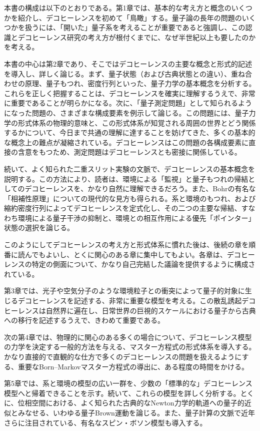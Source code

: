 本書の構成は以下のとおりである。第1章では、基本的な考え方と概念のいくつかを紹介し、デコヒーレンスを初めて「鳥瞰」する。量子論の長年の問題のいくつかを扱うには、「開いた」量子系を考えることが重要であると強調し、この認識とデコヒーレンス研究の考え方が根付くまでに、なぜ半世紀以上も要したのかを考える。

本書の中心は第2章であり、そこではデコヒーレンスの主要な概念と形式的記述を導入し、詳しく論じる。まず、量子状態（および古典状態との違い）、重ね合わせの原理、量子もつれ、密度行列といった、量子力学の基本概念を分析する。これらを正しく把握することは、デコヒーレンスを確実に理解するうえで、非常に重要であることが明らかになる。次に、「量子測定問題」として知られるようになった問題の、さまざまな構成要素を例示して論じる。この問題には、量子力学の形式体系の物理的意味と、この形式体系が知覚される周囲の世界とどう関係するかについて、今日まで共通の理解に達することを妨げてきた、多くの基本的な概念上の難点が凝縮されている。デコヒーレンスはこの問題の各構成要素に直接の含意をもつため、測定問題はデコヒーレンスとも密接に関係している。

続いて、よく知られた二重スリット実験の文脈で、デコヒーレンスの基本概念を説明する。この方法により、読者は、環境による「監視」と量子もつれの帰結としてのデコヒーレンスを、かなり自然に理解できるだろう。また、Bohrの有名な「相補性原理」についての現代的な見方も得られる。系と環境のもつれ、および縮約密度行列によってデコヒーレンスを定式化し、その二つの主要な帰結、すなわち環境による量子干渉の抑制と、環境との相互作用による優先「ポインター」状態の選択を論じる。

このようにしてデコヒーレンスの考え方と形式体系に慣れた後は、後続の章を順番に読んでもよいし、とくに関心のある章に集中してもよい。各章は、デコヒーレンスの特定の側面について、かなり自己完結した議論を提供するように構成されている。

第3章では、光子や空気分子のような環境粒子との衝突によって量子的対象に生じるデコヒーレンスを記述する、非常に重要な模型を考える。この散乱誘起デコヒーレンスは自然界に遍在し、日常世界の巨視的スケールにおける量子から古典への移行を記述するうえで、きわめて重要である。

次の第4章では、物理的に関心のある多くの場合について、デコヒーレンス模型の力学を決定する一般的方法を与える、マスター方程式の形式体系を導入する。かなり直接的で直観的な仕方で多くのデコヒーレンスの問題を扱えるようにする、重要なBorn--Markovマスター方程式の導出に、ある程度の時間をかける。

第5章では、系と環境の模型の広い一群を、少数の「標準的な」デコヒーレンス模型へと帰着できることを示す。続いて、これらの模型を詳しく分析する。とくに、位相空間における、よく知られた古典的なNewton力学的軌道への量子的近似とみなせる、いわゆる量子Brown運動を論じる。また、量子計算の文脈で近年さらに注目されている、有名なスピン・ボソン模型も導入する。

